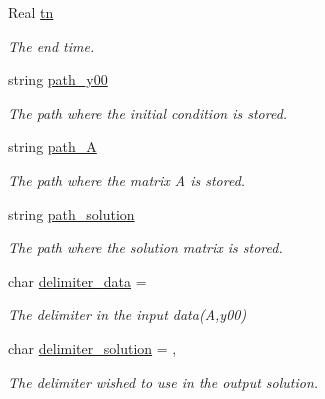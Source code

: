 \begin{DoxyCompactItemize}
\mbox{\label{struct_setting_a18996fc4e88679942fc70d4379053d77}} 
Real \mbox{\hyperlink{struct_setting_a18996fc4e88679942fc70d4379053d77}{tn}}
\begin{DoxyCompactList}\small\item\em The end time. \end{DoxyCompactList}\item 
\mbox{\label{struct_setting_a9f9d6c2e92d90956166bbe755200c3a5}} 
string \mbox{\hyperlink{struct_setting_a9f9d6c2e92d90956166bbe755200c3a5}{path\+\_\+y00}}
\begin{DoxyCompactList}\small\item\em The path where the initial condition is stored. \end{DoxyCompactList}\item 
\mbox{\label{struct_setting_aced1bbb9f4dc3f67c971cbac3f71c4ec}} 
string \mbox{\hyperlink{struct_setting_aced1bbb9f4dc3f67c971cbac3f71c4ec}{path\+\_\+A}}
\begin{DoxyCompactList}\small\item\em The path where the matrix A is stored. \end{DoxyCompactList}\item 
\mbox{\label{struct_setting_a7998cafc0fbfa965728f0473b786be97}} 
string \mbox{\hyperlink{struct_setting_a7998cafc0fbfa965728f0473b786be97}{path\+\_\+solution}}
\begin{DoxyCompactList}\small\item\em The path where the solution matrix is stored. \end{DoxyCompactList}\item 
\mbox{\label{struct_setting_ab533af9e0e9b0f0d574e8caa57fc5c49}} 
char \mbox{\hyperlink{struct_setting_ab533af9e0e9b0f0d574e8caa57fc5c49}{delimiter\+\_\+data}} = \textquotesingle{} \textquotesingle{}
\begin{DoxyCompactList}\small\item\em The delimiter in the input data(\+A,y00) \end{DoxyCompactList}\item 
\mbox{\label{struct_setting_a408ec115a7aef35d1ea1822417b75701}} 
char \mbox{\hyperlink{struct_setting_a408ec115a7aef35d1ea1822417b75701}{delimiter\+\_\+solution}} = \textquotesingle{},\textquotesingle{}
\begin{DoxyCompactList}\small\item\em The delimiter wished to use in the output solution. \end{DoxyCompactList}\end{DoxyCompactItemize}


